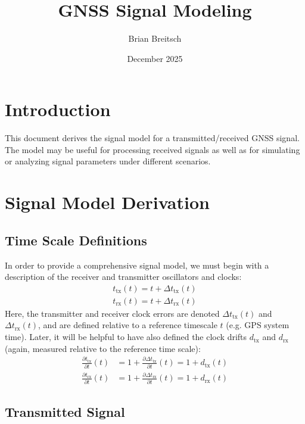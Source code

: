 \documentclass{article}
\title{GNSS Signal Modeling}
\author{Brian Breitsch}
\date{December 2025}
\begin{document}
\maketitle

\section{Introduction}

This document derives the signal model for a transmitted/received GNSS signal.  The model may be useful for processing received signals as well as for simulating or analyzing signal parameters under different scenarios.

\section{Signal Model Derivation}

\subsection{Time Scale Definitions}

In order to provide a comprehensive signal model, we must begin with a description of the receiver and transmitter oscillators and clocks:
%
\begin{align}
t_\text{tx}(t) = t + \Delta t_\text{tx}(t)  \\
t_\text{rx}(t) = t + \Delta t_\text{rx}(t)
\end{align}
%
Here, the transmitter and receiver clock errors are denoted $\Delta t_\text{tx}(t)$ and $\Delta t_\text{rx}(t)$, and are defined relative to a reference timescale $t$ (e.g. GPS system time).  Later, it will be helpful to have also defined the clock drifts $d_\text{tx}$ and $d_\text{rx}$ (again, measured relative to the reference time scale):
%
\begin{align}
\frac{\partial t_\text{tx}}{\partial t}(t) &= 1 + \frac{\partial \Delta t_\text{tx}}{\partial t}(t) = 1 + d_\text{tx}(t)  \\
\frac{\partial t_\text{rx}}{\partial t}(t) &= 1 + \frac{\partial \Delta t_\text{rx}}{\partial t}(t) = 1 + d_\text{rx}(t)
\end{align}
%

\subsection{Transmitted Signal}
\end{document}
